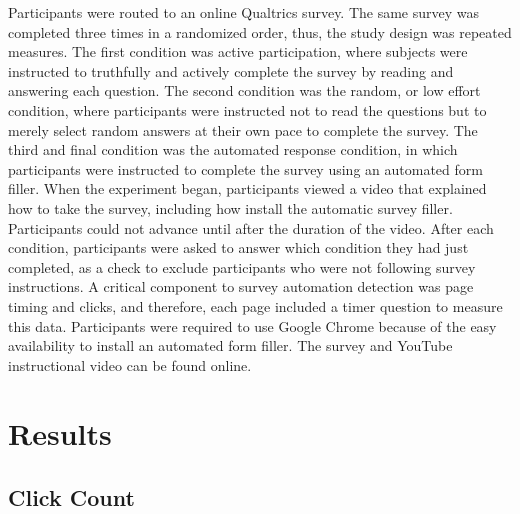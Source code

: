\documentclass[english,man]{apa6}
\theoremstyle{definition}
\theoremstyle{definition}
\theoremstyle{definition}
\theoremstyle{remark}
\begin{document}
Participants were routed to an online Qualtrics survey. The same survey
was completed three times in a randomized order, thus, the study design
was repeated measures. The first condition was active participation,
where subjects were instructed to truthfully and actively complete the
survey by reading and answering each question. The second condition was
the random, or low effort condition, where participants were instructed
not to read the questions but to merely select random answers at their
own pace to complete the survey. The third and final condition was the
automated response condition, in which participants were instructed to
complete the survey using an automated form filler. When the experiment
began, participants viewed a video that explained how to take the
survey, including how install the automatic survey filler. Participants
could not advance until after the duration of the video. After each
condition, participants were asked to answer which condition they had
just completed, as a check to exclude participants who were not
following survey instructions. A critical component to survey automation
detection was page timing and clicks, and therefore, each page included
a timer question to measure this data. Participants were required to use
Google Chrome because of the easy availability to install an automated
form filler. The survey and YouTube instructional video can be found
online.

\section{Results}\label{results-1}

\subsection{Click Count}\label{click-count-1}
\end{document}
